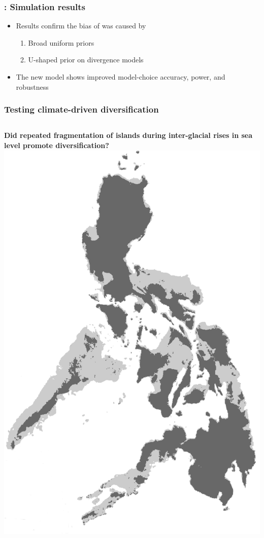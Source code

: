 \begin{frame}
    \frametitle{\dppmsbayes: Simulation results}
    \begin{itemize}
        \item Results confirm the bias of \msb was caused by

        \begin{enumerate}
            \item Broad uniform priors
            \item U-shaped prior on divergence models
        \end{enumerate}

        \item The new model shows improved model-choice accuracy, power, and
            robustness
    \end{itemize}
\end{frame}

\begin{frame}
    \frametitle{Testing climate-driven diversification}
    \begin{columns}[c]
    \textbf{Did repeated fragmentation of islands during inter-glacial rises in sea level
    promote diversification?}\\
            \includegraphics[width=\textwidth]{../images/maps/Philippines.png}
    \end{columns}
\end{frame}


